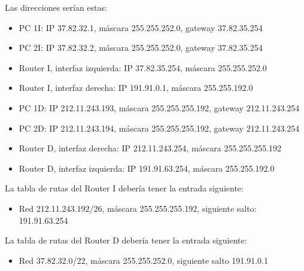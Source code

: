 \documentclass[letterpaper,10pt,spanish]{sphinxmanual}
\begin{document}
\sphinxAtStartPar
Las direcciones serían estas:
\begin{itemize}
\item {} 
\sphinxAtStartPar
PC 1I: IP 37.82.32.1, máscara 255.255.252.0, gateway 37.82.35.254

\item {} 
\sphinxAtStartPar
PC 2I: IP 37.82.32.2, máscara 255.255.252.0, gateway 37.82.35.254

\item {} 
\sphinxAtStartPar
Router I, interfaz izquierda: IP 37.82.35.254, máscara 255.255.252.0

\item {} 
\sphinxAtStartPar
Router I, interfaz derecha: IP 191.91.0.1, máscara 255.255.192.0

\item {} 
\sphinxAtStartPar
PC 1D: IP 212.11.243.193, máscara 255.255.255.192, gateway 212.11.243.254

\item {} 
\sphinxAtStartPar
PC 2D: IP 212.11.243.194, máscara 255.255.255.192, gateway 212.11.243.254

\item {} 
\sphinxAtStartPar
Router D, interfaz derecha: IP 212.11.243.254, máscara 255.255.255.192

\item {} 
\sphinxAtStartPar
Router D, interfaz izquierda: IP 191.91.63.254, máscara 255.255.192.0

\end{itemize}

\sphinxAtStartPar
La tabla de rutas del Router I debería tener la entrada siguiente:
\begin{itemize}
\item {} 
\sphinxAtStartPar
Red 212.11.243.192/26, máscara 255.255.255.192, siguiente salto: 191.91.63.254

\end{itemize}

\sphinxAtStartPar
La tabla de rutas del Router D debería tener la entrada siguiente:
\begin{itemize}
\item {} 
\sphinxAtStartPar
Red 37.82.32.0/22, máscara 255.255.252.0, siguiente salto 191.91.0.1

\end{itemize}
\end{document}
